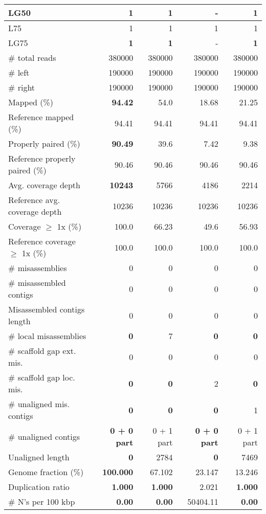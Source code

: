 \documentclass[12pt,a4paper]{article}
\begin{document}
\begin{table}[ht]
\begin{center}
\begin{tabular}{|l*{4}{|r}|}
LG50 & {\bf 1} & {\bf 1} & - & {\bf 1} \\ \hline
L75 & 1 & 1 & 1 & 1 \\ \hline
LG75 & {\bf 1} & {\bf 1} & - & {\bf 1} \\ \hline
\# total reads & 380000 & 380000 & 380000 & 380000 \\ \hline
\# left & 190000 & 190000 & 190000 & 190000 \\ \hline
\# right & 190000 & 190000 & 190000 & 190000 \\ \hline
Mapped (\%) & {\bf 94.42} & 54.0 & 18.68 & 21.25 \\ \hline
Reference mapped (\%) & 94.41 & 94.41 & 94.41 & 94.41 \\ \hline
Properly paired (\%) & {\bf 90.49} & 39.6 & 7.42 & 9.38 \\ \hline
Reference properly paired (\%) & 90.46 & 90.46 & 90.46 & 90.46 \\ \hline
Avg. coverage depth & {\bf 10243} & 5766 & 4186 & 2214 \\ \hline
Reference avg. coverage depth & 10236 & 10236 & 10236 & 10236 \\ \hline
Coverage $\geq$ 1x (\%) & 100.0 & 66.23 & 49.6 & 56.93 \\ \hline
Reference coverage $\geq$ 1x (\%) & 100.0 & 100.0 & 100.0 & 100.0 \\ \hline
\# misassemblies & 0 & 0 & 0 & 0 \\ \hline
\# misassembled contigs & 0 & 0 & 0 & 0 \\ \hline
Misassembled contigs length & 0 & 0 & 0 & 0 \\ \hline
\# local misassemblies & {\bf 0} & 7 & {\bf 0} & {\bf 0} \\ \hline
\# scaffold gap ext. mis. & 0 & 0 & 0 & 0 \\ \hline
\# scaffold gap loc. mis. & {\bf 0} & {\bf 0} & 2 & {\bf 0} \\ \hline
\# unaligned mis. contigs & {\bf 0} & {\bf 0} & {\bf 0} & 1 \\ \hline
\# unaligned contigs & {\bf 0 + 0 part} & 0 + 1 part & {\bf 0 + 0 part} & 0 + 1 part \\ \hline
Unaligned length & {\bf 0} & 2784 & {\bf 0} & 7469 \\ \hline
Genome fraction (\%) & {\bf 100.000} & 67.102 & 23.147 & 13.246 \\ \hline
Duplication ratio & {\bf 1.000} & {\bf 1.000} & 2.021 & {\bf 1.000} \\ \hline
\# N's per 100 kbp & {\bf 0.00} & {\bf 0.00} & 50404.11 & {\bf 0.00} \\ \hline

\end{tabular}
\end{center}
\end{table}
\end{document}
